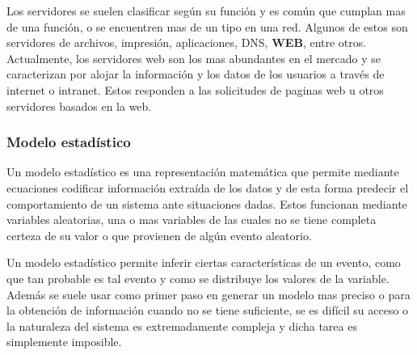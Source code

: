 Los servidores se suelen clasificar según su función y es común que cumplan mas
de una función, o se encuentren mas de un tipo en una red. Algunos de estos son
servidores de archivos, impresión, aplicaciones, DNS, \textbf{WEB}, entre otros.
Actualmente, los servidores web son los mas abundantes en el mercado
y se caracterizan por alojar la información y los datos de los usuarios a través
de internet o intranet. Estos responden a las solicitudes de paginas web u otros
servidores basados en la web.


\subsubsection{Modelo estadístico}

Un modelo estadístico es una representación matemática que permite mediante
ecuaciones codificar información extraída de los datos y de esta forma
predecir el comportamiento de un sistema ante situaciones dadas. Estos
funcionan mediante  variables aleatorias, una o mas variables de las cuales no
se tiene completa certeza de su valor o que provienen de algún evento aleatorio.

Un modelo estadístico permite inferir ciertas características de un evento,
como que tan probable es tal evento y como se distribuye los valores de la
variable. Además se suele usar como primer paso en generar un modelo mas
preciso o para la obtención de información cuando no se tiene suficiente, se
es difícil su acceso o la naturaleza del
sistema es extremadamente compleja y dicha tarea es simplemente imposible.
